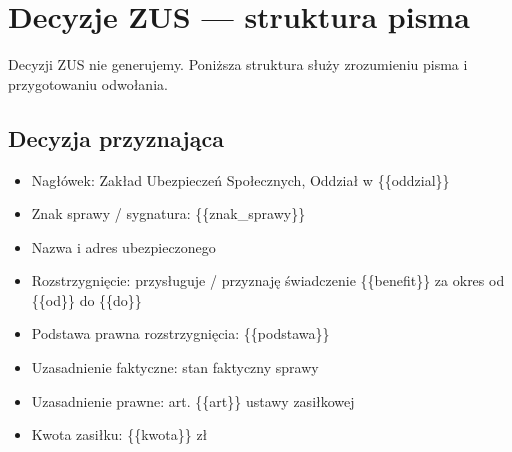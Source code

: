 \documentclass[11pt,a4paper]{article}
\begin{document}
\section*{Decyzje ZUS --- struktura pisma}

{\small\color{szary}Decyzji ZUS nie generujemy. Poniższa struktura służy zrozumieniu pisma i przygotowaniu odwołania.}\par\medskip

\subsection*{Decyzja przyznająca}

\begin{itemize}\item Nagłówek: Zakład Ubezpieczeń Społecznych, Oddział w \{\{oddzial\}\}\end{itemize}

\begin{itemize}\item Znak sprawy / sygnatura: \{\{znak\_sprawy\}\}\end{itemize}

\begin{itemize}\item Nazwa i adres ubezpieczonego\end{itemize}

\begin{itemize}\item Rozstrzygnięcie: przysługuje / przyznaję świadczenie \{\{benefit\}\} za okres od \{\{od\}\} do \{\{do\}\}\end{itemize}

\begin{itemize}\item Podstawa prawna rozstrzygnięcia: \{\{podstawa\}\}\end{itemize}

\begin{itemize}\item Uzasadnienie faktyczne: stan faktyczny sprawy\end{itemize}

\begin{itemize}\item Uzasadnienie prawne: art. \{\{art\}\} ustawy zasiłkowej\end{itemize}

\begin{itemize}\item Kwota zasiłku: \{\{kwota\}\} zł\end{itemize}
\end{document}

